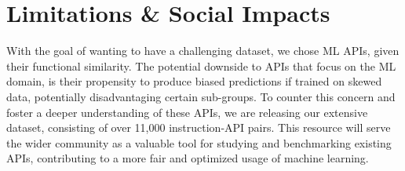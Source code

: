 
\section{Limitations \& Social Impacts}
\label{sec:limitation}

With the goal of wanting to have a challenging dataset, we chose ML APIs, given their functional similarity. The potential downside to APIs that focus on the ML domain, is their propensity to produce biased predictions if trained on skewed data, potentially disadvantaging certain sub-groups. To counter this concern and foster a deeper understanding of these APIs, we are releasing our extensive dataset, consisting of over 11,000 instruction-API pairs. This resource will serve the wider community as a valuable tool for studying and benchmarking existing APIs, contributing to a more fair and optimized usage of machine learning.